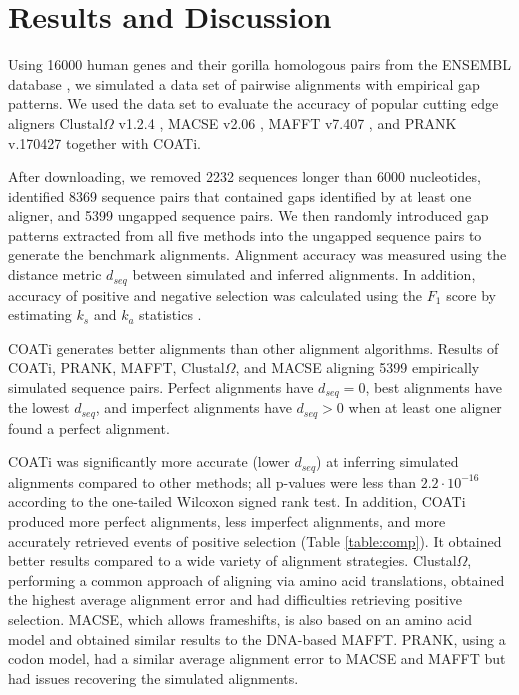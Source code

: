 \section*{Results and Discussion}
Using 16000 human genes and their gorilla homologous pairs from the ENSEMBL
database \parencite{ensembl_hubbard_2002}, we simulated a data set of pairwise
alignments with empirical gap patterns.
We used the data set to evaluate the accuracy of popular cutting edge aligners
Clustal$\Omega$ v1.2.4 \parencite{clustal_omega_sievers_2011},
MACSE v2.06 \parencite{ranwez_macse_2011}, MAFFT v7.407
\parencite{mafft_katoh_2002}, and PRANK v.170427 \parencite{prank_loytynoja_2014}
together with COATi.

After downloading, we removed 2232 sequences longer than 6000 nucleotides, identified 8369 sequence pairs that contained gaps identified by at least one aligner, and 5399 ungapped sequence pairs.
We then randomly introduced gap patterns extracted from all five methods into the ungapped sequence pairs to generate the benchmark alignments.
Alignment accuracy was measured using the distance metric $d_{seq}$
\parencite{metrics_blackburne_whelan_2011} between simulated and inferred
alignments.
In addition, accuracy of positive and negative selection was calculated
using the $F_1$ score by estimating $k_s$ and $k_a$ statistics
\parencite{ka_ks_li_1993}.

\begin{table}[!ht]
\centering

 \caption{COATi generates better alignments than other alignment algorithms. Results of COATi, PRANK, MAFFT, Clustal$\Omega$, and MACSE aligning 5399 empirically simulated sequence pairs. Perfect alignments have $d_{seq}=0$, best alignments have the lowest $d_{seq}$, and imperfect alignments have $d_{seq}>0$ when at least one aligner found a perfect alignment.}
 \label{table:comp}
\end{table}

COATi was significantly more accurate (lower $d_{seq}$) at inferring simulated alignments compared to other methods; all p-values were less than $2.2 \cdot 10^{-16}$ according to the one-tailed Wilcoxon signed rank test.
In addition, COATi produced more perfect alignments, less imperfect alignments, and more accurately retrieved events of positive selection (Table \ref{table:comp}).
It obtained better results compared to a wide variety of alignment strategies.
Clustal$\Omega$, performing a common approach of aligning via amino acid translations, obtained the highest average alignment error and had difficulties retrieving positive selection.
MACSE, which allows frameshifts, is also based on an amino acid model and obtained similar results to the DNA-based MAFFT.
PRANK, using a codon model, had a similar average alignment error to MACSE and MAFFT but had issues recovering the simulated alignments.


